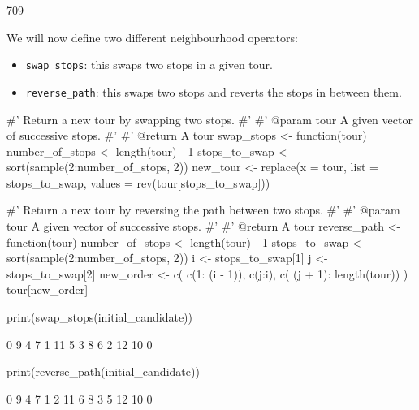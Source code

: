 \begin{Rout}
[1] 709
\end{Rout}

We will now define two different neighbourhood operators:

\begin{itemize}
    \item \texttt{swap_stops}: this swaps two stops in a given tour.
    \item \texttt{reverse_path}: this swaps two stops and reverts the
        stops in between them.
\end{itemize}

\begin{Rin}
#' Return a new tour by swapping two stops.
#'
#' @param tour A given vector of successive stops.
#'
#' @return A tour
swap_stops <- function(tour){
    number_of_stops <- length(tour) - 1
    stops_to_swap <- sort(sample(2:number_of_stops, 2))
    new_tour <- replace(x = tour,
                        list = stops_to_swap,
                        values = rev(tour[stops_to_swap]))
    }

#' Return a new tour by reversing the path between two stops.
#'
#' @param tour A given vector of successive stops.
#'
#' @return A tour
reverse_path <- function(tour){
    number_of_stops <- length(tour) - 1
    stops_to_swap <- sort(sample(2:number_of_stops, 2))
    i <- stops_to_swap[1]
    j <- stops_to_swap[2]
    new_order <- c(
            c(1: (i - 1)),
            c(j:i),
            c( (j + 1): length(tour))
            )
    tour[new_order]
    }
\end{Rin}

\begin{Rin}
print(swap_stops(initial_candidate))
\end{Rin}

\begin{Rout}
 [1]  0  9  4  7  1 11  5  3  8  6  2 12 10  0
\end{Rout}

\begin{Rin}
print(reverse_path(initial_candidate))
\end{Rin}

\begin{Rout}
 [1]  0  9  4  7  1  2 11  6  8  3  5 12 10  0
\end{Rout}

